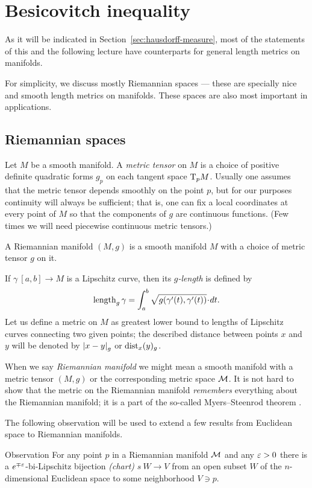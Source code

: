 \chapter{Besicovitch inequality} 

As it will be indicated in Section~\ref{sec:hausdorff-measure},
most of the statements of this and the following lecture have counterparts for general length metrics on manifolds.

For simplicity, we discuss mostly Riemannian spaces --- these are specially nice and smooth length metrics on manifolds.
These spaces are also most important in applications.

\section{Riemannian spaces}

Let $M$ be a smooth manifold.
A \emph{metric tensor} on $M$ is a choice of positive definite quadratic forms $g_p$ on each tangent space $\mathrm{T}_pM$.
Usually one assumes that the metric tensor depends smoothly on the point $p$,
but for our purposes continuity will always be sufficient;
that is, one can fix a local coordinates at every point of $M$ so that the components of $g$ are continuous functions.
(Few times we will need piecewise continuous metric tensors.)

A Riemannian manifold $(M,g)$ is a smooth manifold $M$ with a choice of metric tensor $g$ on it.


If $\gamma\:[a,b]\to M$ is a Lipschitz curve, then its \emph{$g$-length} is defined by
\[\length_g\gamma=\int_a^b\sqrt{g(\gamma'(t),\gamma'(t))}\cdot dt.\]
Let us define a metric on $M$ as greatest lower bound to lengths of Lipschitz curves connecting two given points;
the described distance between points $x$ and $y$ will be denoted by $\dist{x}{y}{g}$ or $\mathrm{dist}_x(y)_g$.

When we say \emph{Riemannian manifold} we might mean a smooth manifold with a metric tensor $(M,g)$ or the corresponding metric space $\mathcal{M}$. 
It is not hard to show that the metric on the Riemannian manifold {}\emph{remembers} everything about the Riemannian manifold;
it is a part of the so-called Myers--Steenrod theorem \cite{myers-steenrod}.

The following observation will be used to extend a few results from Euclidean space to Riemannian manifolds.

\begin{thm}{Observation}\label{obs:lip-chart}
For any point $p$ in a Riemannian manifold $\mathcal{M}$ and any $\varepsilon>0$ there is a $e^{\mp\varepsilon}$-bi-Lipschitz bijection \emph{(chart)} $s\:W\to V$ from an open subset $W$ of the $n$-dimensional Euclidean space to some neighborhood $V\ni p$.
\end{thm}

